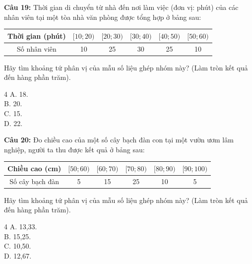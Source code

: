 \documentclass[12pt]{article}
\begin{document}
	\noindent \textbf{Câu 19:} Thời gian di chuyển từ nhà đến nơi làm việc (đơn vị: phút) của các nhân viên tại một tòa nhà văn phòng được tổng hợp ở bảng sau:
	\begin{center}
		\renewcommand{\arraystretch}{1.3}
		\begin{tabular}{|c|c|c|c|c|c|}
			\hline
			Thời gian (phút) & $[10; 20)$ & $[20; 30)$ & $[30; 40)$ & $[40; 50)$ & $[50; 60)$ \\
			\hline
			Số nhân viên & 10 & 25 & 30 & 25 & 10 \\
			\hline
		\end{tabular}
	\end{center}
	Hãy tìm khoảng tứ phân vị của mẫu số liệu ghép nhóm này? (Làm tròn kết quả đến hàng phần trăm).
	\begin{multicols}{4}
		A. 18. \\
		B. 20. \\
		C. 15. \\
		D. 22.
	\end{multicols}
	
	\vspace{4mm}
	
	\noindent \textbf{Câu 20:} Đo chiều cao của một số cây bạch đàn con tại một vườn ươm lâm nghiệp, người ta thu được kết quả ở bảng sau:
	\begin{center}
		\renewcommand{\arraystretch}{1.3}
		\begin{tabular}{|c|c|c|c|c|c|}
			\hline
			Chiều cao (cm) & $[50; 60)$ & $[60; 70)$ & $[70; 80)$ & $[80; 90)$ & $[90; 100)$ \\
			\hline
			Số cây bạch đàn & 5 & 15 & 25 & 10 & 5 \\
			\hline
		\end{tabular}
	\end{center}
	Hãy tìm khoảng tứ phân vị của mẫu số liệu ghép nhóm này? (Làm tròn kết quả đến hàng phần trăm).
	\begin{multicols}{4}
		A. 13,33. \\
		B. 15,25. \\
		C. 10,50. \\
		D. 12,67.
	\end{multicols}
	
	\vspace{4mm}
	
\end{document}
